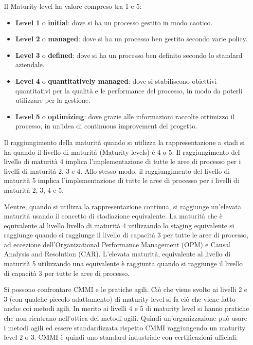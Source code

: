 \begin{enumerate}
            Il Maturity level ha valore compreso tra 1 e 5:
            \begin{itemize}
                  \item \textbf{Level 1} o \textbf{initial}: dove si ha un processo
                        gestito in modo caotico.
                  \item \textbf{Level 2} o \textbf{managed}: dove si ha un processo
                        ben gestito secondo varie policy.
                  \item \textbf{Level 3} o \textbf{defined}: dove si ha un processo
                        ben definito secondo lo standard aziendale.
                  \item \textbf{Level 4} o \textbf{quantitatively managed}: dove
                        si stabiliscono obiettivi quantitativi per la qualità e
                        le performance del processo, in modo da poterli utilizzare
                        per la gestione.
                  \item \textbf{Level 5} o \textbf{optimizing}: dove grazie alle
                        informazioni raccolte ottimizzo il processo, in un'idea di
                        continuous improvement del progetto.
            \end{itemize}
\end{enumerate}
Il raggiungimento della maturità quando si utilizza la rappresentazione a stadi
si ha quando il livello di maturità (Maturity levels) è 4 o 5. Il raggiungimento
del livello di maturità 4 implica l'implementazione di tutte le aree di processo
per i livelli di maturità 2, 3 e 4. Allo stesso modo, il raggiungimento del livello
di maturità 5 implica l'implementazione di tutte le aree di processo per i
livelli di maturità 2, 3, 4 e 5.

Mentre, quando si utilizza la rappresentazione continua, si raggiunge un'elevata
maturità usando il concetto di stadiazione equivalente. La maturità che è
equivalente al livello livello di maturità 4 utilizzando lo staging equivalente
si raggiunge quando si raggiunge il livello di capacità 3 per tutte le aree di
processo, ad eccezione dell'Organizational Performance Management (OPM) e Causal
Analysis and Resolution (CAR). L'elevata maturità, equivalente al livello di
maturità 5 utilizzando una equivalente è raggiunta quando si raggiunge il livello
di capacità 3 per tutte le aree di processo.

Si possono confrontare CMMI e le pratiche agili. Ciò che viene svolto ai livelli
2 e 3 (con qualche piccolo adattamento) di maturity level si fa ciò che viene
fatto anche coi metodi agili. In merito ai livelli 4 e 5 di maturity level si hanno
pratiche che non rientrano nell'ottica dei metodi agili. Quindi un'organizzazione
può usare i metodi agili ed essere standardizzata rispetto CMMI raggiungendo
un maturity level 2 o 3. CMMI è quindi uno standard industriale con certificazioni
ufficiali.